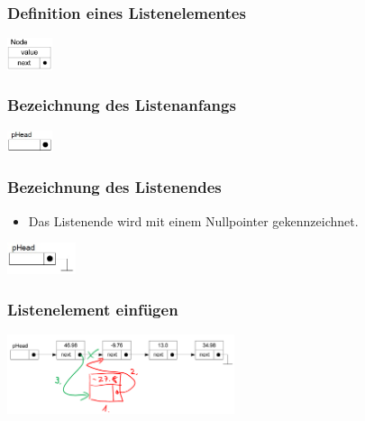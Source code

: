 \subsubsection{Definition eines Listenelementes}
\begin{flushleft}
  {\includegraphics[width=0.1\textwidth]{images/Listen/SLL.png}}
  \label{Fig: Single Linked List}
\end{flushleft}


\subsubsection{Bezeichnung des Listenanfangs}
\begin{flushleft}
  {\includegraphics[width=0.1\textwidth]{images/Listen/SLL_Anfang.jpg}}
  \label{Fig: Single Linked List}
\end{flushleft}


\subsubsection{Bezeichnung des Listenendes}
\begin{itemize}
  \item Das Listenende wird mit einem Nullpointer gekennzeichnet.
\end{itemize}
\begin{flushleft}
  {\includegraphics[width=0.15\textwidth]{images/Listen/SLL_Ende.jpg}}
  \label{Fig: Single Linked List}
\end{flushleft}

\subsubsection{Listenelement einfügen}
\begin{flushleft}
{\includegraphics[width=0.5\textwidth]{images/Listen/SLL_Insert.png}}
\label{Fig: Element bei SLL einf"ugen}
\end{flushleft}


